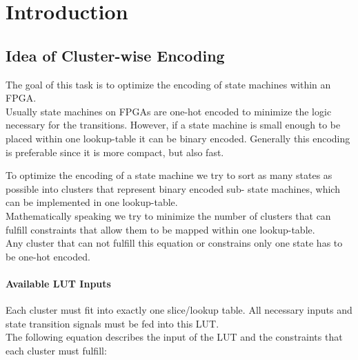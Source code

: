 \chapter{Introduction}
\label{cha:introduction}





\section{Idea of Cluster-wise Encoding}
\label{sec:clusterSearch}

The goal of this task is to optimize the encoding of state machines within an FPGA.\\
Usually state machines on FPGAs are one-hot encoded to minimize the logic necessary for the transitions. However, if a state machine is small enough to be placed within one lookup-table it can be binary encoded. Generally this encoding is preferable since it is more compact, but also fast.

To optimize the encoding of a state machine we try to sort as many states as possible into clusters that represent binary encoded sub- state machines, which can be implemented in one lookup-table.\\
Mathematically speaking we try to minimize the number of clusters that can fulfill constraints that allow them to be mapped within one lookup-table.\\
Any cluster that can not fulfill this equation or constrains only one state has to be one-hot encoded.



\subsubsection{Available LUT Inputs}
\label{subsubsec:LUTInputs}
Each cluster must fit into exactly one slice/lookup table. All necessary inputs and state transition signals must be fed into this LUT. \\
The following equation describes the input of the LUT and the constraints that each cluster must fulfill:

